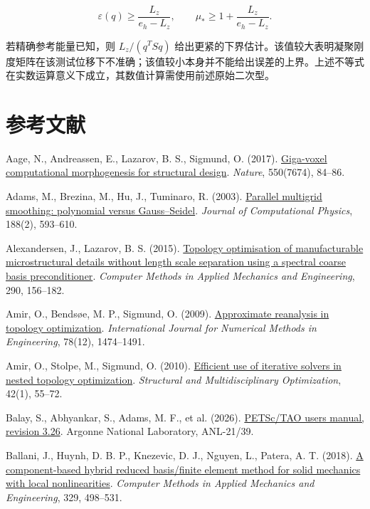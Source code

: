 \documentclass[preprint,12pt,authoryear]{elsarticle}
\begin{document}
\[
\varepsilon(q)\ge\frac{L_z}{e_h-L_z},\qquad
\mu_*\ge1+\frac{L_z}{e_h-L_z}.
\tag{I.2}
\]

若精确参考能量已知，则 \(L_z/(q^TSq)\) 给出更紧的下界估计。该值较大表明凝聚刚度矩阵在该测试位移下不准确；该值较小本身并不能给出误差的上界。上述不等式在实数运算意义下成立，其数值计算需使用前述原始二次型。

\section*{参考文献}
\begingroup\small\setlength{\parindent}{0pt}\setlength{\parskip}{3pt}
Aage, N., Andreassen, E., Lazarov, B. S., Sigmund, O. (2017). \href{https://doi.org/10.1038/nature23911}{Giga-voxel computational morphogenesis for structural design}. \emph{Nature}, 550(7674), 84--86.

Adams, M., Brezina, M., Hu, J., Tuminaro, R. (2003). \href{https://doi.org/10.1016/s0021-9991(03)00194-3}{Parallel multigrid smoothing: polynomial versus Gauss--Seidel}. \emph{Journal of Computational Physics}, 188(2), 593--610.

Alexandersen, J., Lazarov, B. S. (2015). \href{https://doi.org/10.1016/j.cma.2015.02.028}{Topology optimisation of manufacturable microstructural details without length scale separation using a spectral coarse basis preconditioner}. \emph{Computer Methods in Applied Mechanics and Engineering}, 290, 156--182.

Amir, O., Bendsøe, M. P., Sigmund, O. (2009). \href{https://doi.org/10.1002/nme.2536}{Approximate reanalysis in topology optimization}. \emph{International Journal for Numerical Methods in Engineering}, 78(12), 1474--1491.

Amir, O., Stolpe, M., Sigmund, O. (2010). \href{https://doi.org/10.1007/s00158-009-0463-4}{Efficient use of iterative solvers in nested topology optimization}. \emph{Structural and Multidisciplinary Optimization}, 42(1), 55--72.

Balay, S., Abhyankar, S., Adams, M. F., et al. (2026). \href{https://petsc.org/release/manual/}{PETSc/TAO users manual, revision 3.26}. Argonne National Laboratory, ANL-21/39.

Ballani, J., Huynh, D. B. P., Knezevic, D. J., Nguyen, L., Patera, A. T. (2018). \href{https://doi.org/10.1016/j.cma.2017.09.014}{A component-based hybrid reduced basis/finite element method for solid mechanics with local nonlinearities}. \emph{Computer Methods in Applied Mechanics and Engineering}, 329, 498--531.
\end{document}
